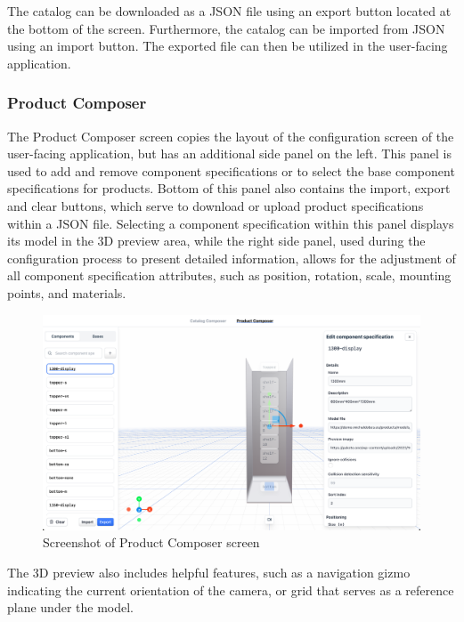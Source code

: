 The catalog can be downloaded as a JSON file using an export button located at the bottom of the screen. Furthermore, the catalog can be imported from JSON using an import button. The exported file can then be utilized in the user-facing application.


\subsubsection{Product Composer}

The Product Composer screen copies the layout of the configuration screen of the user-facing application, but has an additional side panel on the left. This panel is used to add and remove component specifications or to select the base component specifications for products. Bottom of this panel also contains the import, export and clear buttons, which serve to download or upload product specifications within a JSON file. Selecting a component specification within this panel displays its model in the 3D preview area, while the right side panel, used during the configuration process to present detailed information, allows for the adjustment of all component specification attributes, such as position, rotation, scale, mounting points, and materials.

\begin{figure}[h!]
\centering
\includegraphics[width=\textwidth]{images/screenshot_productcomposer.png}
\caption{Screenshot of Product Composer screen}
\label{fig:screenshot-produtcomposer}
\end{figure}

The 3D preview also includes helpful features, such as a navigation gizmo indicating the current orientation of the camera, or grid that serves as a reference plane under the model.

